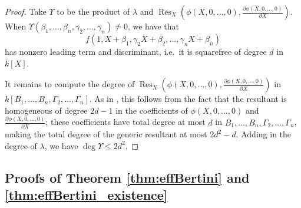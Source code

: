 \documentclass{amsart}
\renewcommand{\v}{\beta}
\newcommand{\w}{\gamma}
\newcommand{\vvar}{B}
\newcommand{\wvar}{\Gamma}
\DeclareMathOperator{\Res}{Res}
\theoremstyle{definition}
\numberwithin{equation}{section}
\numberwithin{table}{section}
\begin{document}
\begin{proof}
	Take $\Upsilon$ to be the product of $\lambda$ and $\Res_X \left(\phi(X,0,\ldots,0),\frac{\partial \phi(X,0,\ldots,0)}{\partial X}\right)$. When $\Upsilon(\v_1,\ldots,\v_n,\w_2,\ldots,\w_n) \neq 0$, we have that
	\[f(1,X+\v_1,\w_2X +\v_2,\ldots,\w_nX +\v_n)\] 
	has nonzero leading term and discriminant, i.e.\ it is squarefree of degree $d$ in $\overline{k}[X]$. 
	
	It remains to compute the degree of $\Res_X \left(\phi(X,0,\ldots,0),\frac{\partial \phi(X,0,\ldots,0)}{\partial X}\right)$ in $k[\vvar_1,\ldots,\vvar_n,\wvar_2,\ldots,\wvar_n]$. As in \cite[Lemma 4]{Kaltofen}, this follows from the fact that the resultant is homogeneous of degree $2d-1$ in the coefficients of $\phi(X,0,\ldots,0)$ and $\frac{\partial \phi(X,0,\ldots,0)}{\partial X}$; these coefficients have total degree at most $d$ in $\vvar_1,\ldots,\vvar_n,\wvar_2,\ldots,\wvar_n$, making the total degree of the generic resultant at most $2d^2-d$. Adding in the degree of $\lambda$, we have $\deg \Upsilon \leq 2d^2$.
\end{proof}

\subsection{Proofs of Theorem \ref{thm:effBertini} and \ref{thm:effBertini_existence}}
\label{subsec:proofs_effBertini}
\end{document}
